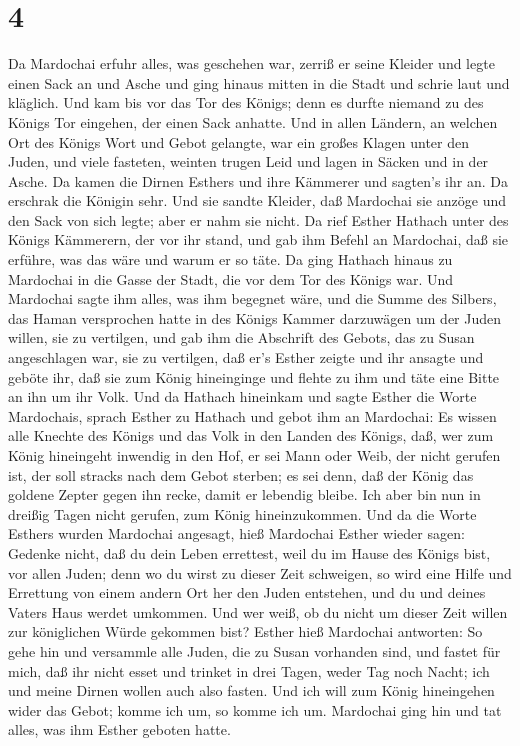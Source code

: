 \hypertarget{section-3}{%
\section{4}\label{section-3}}

 Da Mardochai erfuhr alles, was geschehen war, zerriß er
seine Kleider und legte einen Sack an und Asche und ging hinaus mitten
in die Stadt und schrie laut und kläglich.  Und kam bis vor
das Tor des Königs; denn es durfte niemand zu des Königs Tor eingehen,
der einen Sack anhatte.  Und in allen Ländern, an welchen
Ort des Königs Wort und Gebot gelangte, war ein großes Klagen unter den
Juden, und viele fasteten, weinten trugen Leid und lagen in Säcken und
in der Asche.  Da kamen die Dirnen Esthers und ihre Kämmerer
und sagten's ihr an. Da erschrak die Königin sehr. Und sie sandte
Kleider, daß Mardochai sie anzöge und den Sack von sich legte; aber er
nahm sie nicht.  Da rief Esther Hathach unter des Königs
Kämmerern, der vor ihr stand, und gab ihm Befehl an Mardochai, daß sie
erführe, was das wäre und warum er so täte.  Da ging Hathach
hinaus zu Mardochai in die Gasse der Stadt, die vor dem Tor des Königs
war.  Und Mardochai sagte ihm alles, was ihm begegnet wäre,
und die Summe des Silbers, das Haman versprochen hatte in des Königs
Kammer darzuwägen um der Juden willen, sie zu vertilgen, 
und gab ihm die Abschrift des Gebots, das zu Susan angeschlagen war, sie
zu vertilgen, daß er's Esther zeigte und ihr ansagte und geböte ihr, daß
sie zum König hineinginge und flehte zu ihm und täte eine Bitte an ihn
um ihr Volk.  Und da Hathach hineinkam und sagte Esther die
Worte Mardochais,  sprach Esther zu Hathach und gebot ihm
an Mardochai:  Es wissen alle Knechte des Königs und das
Volk in den Landen des Königs, daß, wer zum König hineingeht inwendig in
den Hof, er sei Mann oder Weib, der nicht gerufen ist, der soll stracks
nach dem Gebot sterben; es sei denn, daß der König das goldene Zepter
gegen ihn recke, damit er lebendig bleibe. Ich aber bin nun in dreißig
Tagen nicht gerufen, zum König hineinzukommen.  Und da die
Worte Esthers wurden Mardochai angesagt,  hieß Mardochai
Esther wieder sagen: Gedenke nicht, daß du dein Leben errettest, weil du
im Hause des Königs bist, vor allen Juden;  denn wo du
wirst zu dieser Zeit schweigen, so wird eine Hilfe und Errettung von
einem andern Ort her den Juden entstehen, und du und deines Vaters Haus
werdet umkommen. Und wer weiß, ob du nicht um dieser Zeit willen zur
königlichen Würde gekommen bist?  Esther hieß Mardochai
antworten:  So gehe hin und versammle alle Juden, die zu
Susan vorhanden sind, und fastet für mich, daß ihr nicht esset und
trinket in drei Tagen, weder Tag noch Nacht; ich und meine Dirnen wollen
auch also fasten. Und ich will zum König hineingehen wider das Gebot;
komme ich um, so komme ich um.  Mardochai ging hin und tat
alles, was ihm Esther geboten hatte.

